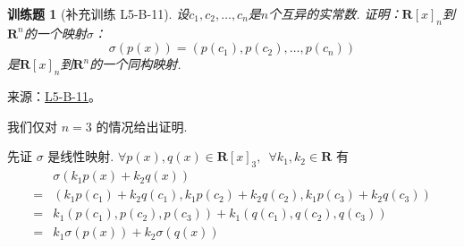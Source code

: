 \documentclass[12pt,fontset=fandol]{ctexart}
\newtheorem{exercise}{训练题}[section]
\begin{document}
\begin{exercise}[补充训练 L5-B-11]\label{prob:L5-B-11}
设$c_1,c_2,\ldots,c_n$是$n$个互异的实常数. 证明：$\mathbf{R}[x]_n$到$\mathbf{R}^n$的一个映射$\sigma$：
        \[\sigma(p(x))=(p(c_1),p(c_2),\ldots,p(c_n))\]
        是$\mathbf{R}[x]_n$到$\mathbf{R}^n$的一个同构映射.
\end{exercise}
\noindent 来源：\href{https://github.com/yhwu-is/Linear-Algebra-Left-Undone/blob/new/%E8%AE%B2%E4%B9%89/%E4%B8%93%E9%A2%98/5%20%E7%BA%BF%E6%80%A7%E6%98%A0%E5%B0%84.tex}{L5-B-11}。
\begin{solve}
我们仅对 $ n = 3 $ 的情况给出证明. 

          先证 $ \sigma $ 是线性映射. $ \forall p(x), q(x) \in \mathbf{R}[x]_3,\enspace \forall k_1, k_2 \in \mathbf{R} $ 有
          \begin{align*}
                  & \sigma(k_1 p(x) + k_2 q(x))                                                 \\
              ={} & (k_1 p(c_1) + k_2 q(c_1), k_1 p(c_2) + k_2 q(c_2), k_1 p(c_3) + k_2 q(c_3)) \\
              ={} & k_1(p(c_1), p(c_2), p(c_3)) + k_1(q(c_1), q(c_2), q(c_3))                   \\
              ={} & k_1 \sigma(p(x)) + k_2 \sigma(q(x))
          \end{align*}


\end{solve}
\end{document}
